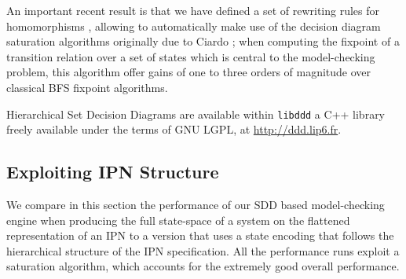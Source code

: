 An important recent result is that we have defined a set of rewriting
rules for homomorphisms \cite{atpn08saturation}, allowing to
automatically make use of the decision diagram saturation algorithms
originally due to Ciardo \cite{ciardo03saturation}; when computing the
fixpoint of a transition relation over a set of states which is
central to the model-checking problem, this algorithm offer gains of
one to three orders of magnitude over classical BFS fixpoint
algorithms.

Hierarchical Set Decision Diagrams are available within
\texttt{libddd} a C++ library freely available under the terms of
GNU LGPL, at \url{http://ddd.lip6.fr}.

\subsection{Exploiting IPN Structure}
\label{sub:perfs}

We compare in this section the performance of our SDD based
model-checking engine when producing the full state-space of a system on
the flattened representation of an IPN to a version that uses a state
encoding that follows the hierarchical structure of the IPN
specification. All the performance runs exploit a saturation algorithm,
which accounts for the extremely good overall performance.

